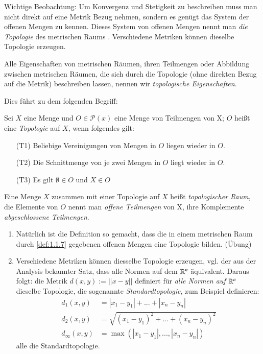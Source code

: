 \documentclass[a4paper,10pt]{scrartcl}
\begin{document}
Wichtige Beobachtung: Um Konvergenz und Stetigkeit zu beschreiben muss man nicht direkt auf eine Metrik Bezug nehmen, sondern es genügt das System der offenen Mengen zu kennen.  Dieses System von offenen Mengen nennt man \emph{die Topologie} des metrischen Raums .  Verschiedene Metriken können dieselbe Topologie erzeugen.

Alle Eigenschaften von metrischen Räumen, ihren Teilmengen oder Abbildung zwischen metrischen Räumen, die sich durch die Topologie (ohne direkten Bezug auf die Metrik) beschreiben lassen, nennen wir \emph{topologische Eigenschaften}.

Dies führt zu dem folgenden Begriff:
\begin{df}
Sei $ X $ eine Menge und $O \in \mathcal P (x)$ eine Menge von Teilmengen von X; $ O $ heißt eine \emph{Topologie} auf $ X $, wenn folgendes gilt:
\begin{itemize}
\item[(T1)] Beliebige Vereinigungen von Mengen in $ O $ liegen wieder in $O$.
\item[(T2)] Die Schnittmenge von je zwei Mengen in $  O  $ liegt wieder in $O$.
\item[(T3)] Es gilt $ \emptyset \in O $ und $ X \in O$
\end{itemize}
Eine Menge $ X $ zusammen mit einer Topologie auf $ X $ heißt \emph{topologischer Raum}, die Elemente von $ O $ nennt man \emph{offene Teilmengen} von X, ihre Komplemente \emph{abgeschlossene Teilmengen}.
\end{df}
\begin{note*}
\begin{enumerate}
\item Natürlich ist die Definition so gemacht, dass die in einem metrischen Raum durch \ref{def:1.1.7} gegebenen offenen Mengen eine Topologie bilden. (Übung) \fixme[fig5]
\item Verschiedene Metriken können diesselbe Topologie erzeugen, vgl. der aus der Analysis bekannter Satz, dass alle Normen auf dem $ \mathbb{R}^n $ äquivalent.
  Daraus folgt: die Metrik $ d(x,y) :=||x-y|| $ definiert für \emph{alle Normen auf $ \mathbb{R}^n $} dieselbe Topologie, die sogenannte \emph{Standardtopologie}, zum Beispiel definieren:
\begin{align*}
d_1(x,y)&=|x_1-y_1|+...+|x_n-y_n|\\
d_2(x,y)&=\sqrt{(x_1-y_1)^2+...+(x_n-y_n)^2}\\
d_\infty(x,y)&=\max(|x_1-y_1|, ..., |x_n-y_n|)
\end{align*}
alle die Standardtopologie.
\end{enumerate}
\end{note*}
\end{document}
